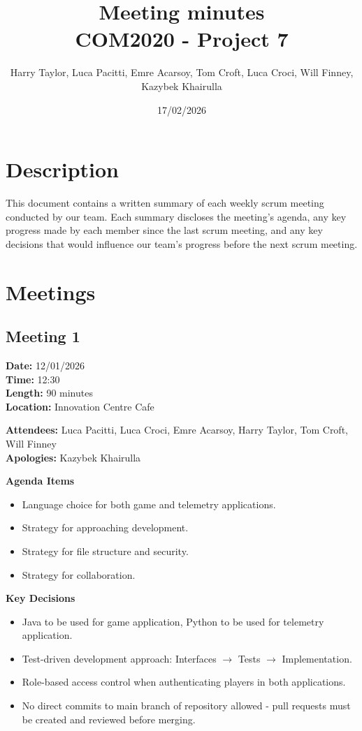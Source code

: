 \documentclass[11pt]{article}
\title{Meeting minutes\\[0.3em]
\large COM2020 - Project 7}
\author{Harry Taylor, Luca Pacitti, Emre Acarsoy, Tom Croft, Luca Croci, Will Finney, \\ Kazybek Khairulla}
\date{17/02/2026}
\begin{document}
    \maketitle
    \tableofcontents
    \newpage


    \section{Description}

    This document contains a written summary of each weekly scrum meeting conducted by our team.
    Each summary discloses the meeting's agenda, any key progress made by each member since the last scrum meeting, and any key decisions that would influence our team's progress before the next scrum meeting.

    \section{Meetings}

    \subsection{Meeting 1}

    \textbf{Date:} 12/01/2026 \\
    \textbf{Time:} 12:30 \\
    \textbf{Length:} 90 minutes \\
    \textbf{Location:} Innovation Centre Cafe

    \textbf{Attendees:} Luca Pacitti, Luca Croci, Emre Acarsoy, Harry Taylor, Tom Croft, Will Finney \\
    \textbf{Apologies:} Kazybek Khairulla

    \textbf{Agenda Items}
    \begin{itemize}
        \item Language choice for both game and telemetry applications.
        \item Strategy for approaching development.
        \item Strategy for file structure and security.
        \item Strategy for collaboration.
    \end{itemize}

    \textbf{Key Decisions}
    \begin{itemize}
        \item Java to be used for game application, Python to be used for telemetry application.
        \item Test-driven development approach: Interfaces $\rightarrow$ Tests $\rightarrow$ Implementation.
        \item Role-based access control when authenticating players in both applications.
        \item No direct commits to main branch of repository allowed - pull requests must be created and reviewed before merging.
    \end{itemize}
\end{document}
